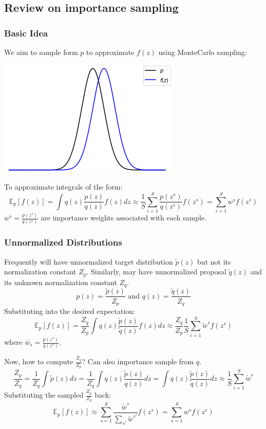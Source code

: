 \documentclass{article}
\begin{document}
\subsection{Review on importance sampling}


\subsubsection{Basic Idea}
We aim to sample form $p$ to approximate $f(z)$ using MonteCarlo sampling:
\begin{center}
\includegraphics[scale=0.5]{normal_dist.png}
\end{center}

To approximate integrals of the form:
\[ \mathbb{E}_p[f(z)] = \int q(z) \frac{p(z)}{q(z)}f(z)dz \approx \frac{1}{S} \sum_{i=1}^S\frac{p(z^s)}{q(z^s)}f(z^s) = \sum_{i=1}^Sw^sf(z^s)\]
$w^s = \frac{p(z^s)}{q(z^s)}$ are importance weights associated with each sample.

\subsubsection{Unnormalized Distributions}
Frequently will have unnormalized target distribution $\tilde{p}(z)$ but not its normalization constant $Z_p$. Similarly, may have unnormalized proposal $\tilde{q}(z)$ and its unknown normalization constant $Z_q$.
\[p(z) = \frac{\tilde{p}(z)}{Z_p} \text{ and } q(z) = \frac{\tilde{q}(z)}{Z_q}\]
Substituting into the desired expectation:
\[ \mathbb{E}_p[f(z)] = \frac{Z_q}{Z_p} \int q(z) \frac{\tilde{p}(z)}{\tilde{q}(z)}f(z)dz \approx \frac{Z_q}{Z_p}\frac{1}{S} \sum_{i=1}^S \tilde{w}^sf(z^s)\]
where $\bar{w}_s = \frac{\bar{p}(z^s)}{\bar{q}(z^s)}$.

Now, how to compute $\frac{Z_q}{Z_p}$? Can also importance sample from $q$.
\[\frac{Z_p}{Z_q} = \frac{1}{Z_q}\int\tilde{p}(z)dz = \frac{1}{Z_q}\int q(z)\frac{\tilde{p}(z)}{q(z)}dz = \int q(z)\frac{\tilde{p}(z)}{\tilde{q}(z)}dz \approx \frac{1}{S}\sum_{i=1}^S\tilde{w}^s\]
Substituting the sampled $\frac{Z_p}{Z_q}$ back:
\[\mathbb{E}_p[f(z)] \approx \sum_{s=1}^S \frac{\tilde{w}^s}{\sum_{s'}\tilde{w}^{s'}}f(z^s) = \sum_{s=1}^S w^s f(z^s)\]
\end{document}
